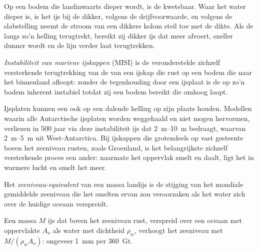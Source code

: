Op een bodem die landinwaarts dieper wordt, is de  kwetsbaar. Waar het
water dieper is, is het ijs bij de  dikker, volgens de drijfvoorwaarde,
en volgens de slabstelling neemt de stroom van een dikkere kolom
steil toe met de dikte. Als de  langs zo'n
helling terugtrekt, bereikt zij dikker ijs dat meer afvoert, sneller dunner wordt en
de lijn verder laat terugtrekken.

\begin{definition}\label{def:b3:glaciology:misi}
\emph{Instabiliteit van mariene ijskappen}
(MISI) is de veronderstelde zichzelf versterkende terugtrekking van de
 van een ijskap die rust op een bodem die naar het binnenland
afloopt: zonder de tegenhouding door een ijsplaat is de  op zo'n
bodem inherent instabiel totdat zij een bodem bereikt die omhoog loopt.
\end{definition}

Ijsplaten kunnen een  ook op een dalende helling op zijn plaats houden.
Modellen waarin alle Antarctische ijsplaten worden weggehaald en niet mogen
hervormen, verliezen in 500 jaar via deze instabiliteit ijs dat \qtyrange{2}{10}{m}
 bedraagt, waarvan \qtyrange{2}{5}{m} uit West-Antarctica.
Bij ijskappen die grotendeels op vast gesteente boven het zeeniveau rusten, zoals
Groenland, is het belangrijkste zichzelf versterkende proces een ander: naarmate het oppervlak
smelt en daalt, ligt het in warmere lucht en smelt het meer.

\begin{definition}\label{def:b3:glaciology:sle}
Het \emph{zeeniveau-equivalent} van een massa
landijs is de stijging van het mondiale gemiddelde zeeniveau die het smelten
ervan zou veroorzaken als het water zich over de huidige oceaan verspreidt.
\end{definition}

\begin{proposition}\label{prop:b3:glaciology:sle}
Een massa $M$ ijs dat boven het zeeniveau rust, verspreid over een oceaan met oppervlakte
$A_o$ als water met dichtheid $\rho_w$, verhoogt het zeeniveau met $M/(\rho_wA_o)$:
ongeveer \qty{1}{mm} per \qty{360}{Gt}.
\end{proposition}

